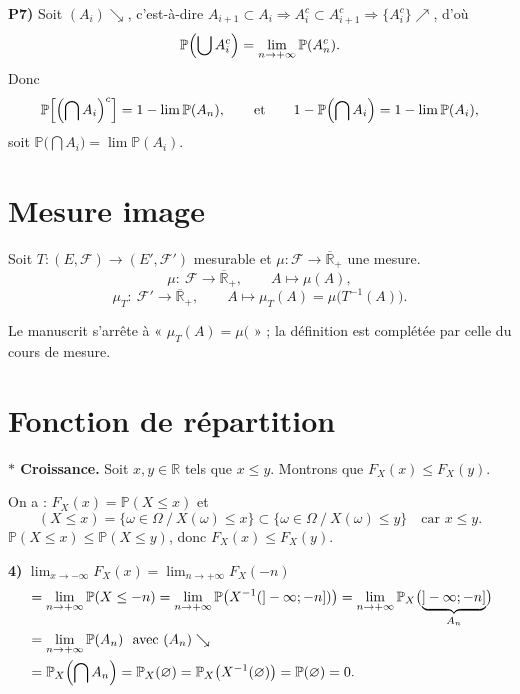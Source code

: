 \documentclass[11pt,a4paper]{article}
\newcommand{\R}{\mathbb{R}}
\newcommand{\Rb}{\overline{\mathbb{R}}}
\newcommand{\Ff}{\mathscr{F}}
\newcommand{\PP}{\mathbb{P}}
\begin{document}
\textbf{\color{bleu}P7)} Soit $(A_i)\searrow$, c'est-à-dire $A_{i+1}\subset A_i\Rightarrow A_i^c\subset A_{i+1}^c\Rightarrow\{A_i^c\}\nearrow$, d'où
\[
  \PP\Bigl(\bigcup A_i^c\Bigr)=\lim_{n\to+\infty}\PP(A_n^c).
\]
Donc
\[
  \PP\Bigl[\Bigl(\bigcap A_i\Bigr)^c\Bigr]=1-\lim\PP(A_n),\qquad\text{et}\qquad 1-\PP\Bigl(\bigcap A_i\Bigr)=1-\lim\PP(A_i),
\]
soit $\PP\bigl(\bigcap A_i\bigr)=\lim\PP(A_i)$.

\section*{Mesure image}

Soit $T:(E,\Ff)\to(E',\Ff')$ mesurable et $\mu:\Ff\to\Rb_+$ une mesure.
\[
  \mu:\ \Ff\longrightarrow\Rb_+,\qquad A\longmapsto\mu(A),
\]
\[
  \mu_T:\ \Ff'\longrightarrow\Rb_+,\qquad A\longmapsto\mu_T(A)=\mu\bigl(T^{-1}(A)\bigr).
\]

\begin{note}
Le manuscrit s'arrête à « $\mu_T(A)=\mu($ » ; la définition est complétée par celle du cours de mesure.
\end{note}

\section*{Fonction de répartition}

\textbf{\color{bleu}$\ast$ Croissance.} Soit $x,y\in\R$ tels que $x\le y$. Montrons que $F_X(x)\le F_X(y)$.

On a : $F_X(x)=\PP(X\le x)$ et
\[
  (X\le x)=\{\omega\in\Omega\ /\ X(\omega)\le x\}\subset\{\omega\in\Omega\ /\ X(\omega)\le y\}\quad\text{car }x\le y .
\]
$\PP(X\le x)\le\PP(X\le y)$, donc $F_X(x)\le F_X(y)$.

\medskip
\textbf{\color{bleu}4)} \quad $\displaystyle\lim_{x\to-\infty}F_X(x)=\lim_{n\to+\infty}F_X(-n)$
\begin{align*}
  &=\lim_{n\to+\infty}\PP(X\le-n)=\lim_{n\to+\infty}\PP\bigl(X^{-1}(]-\infty;-n])\bigr)=\lim_{n\to+\infty}\PP_X\bigl(\underbrace{]-\infty;-n]}_{A_n}\bigr)\\
  &=\lim_{n\to+\infty}\PP(A_n)\ \text{ avec }(A_n)\searrow\\
  &=\PP_X\Bigl(\bigcap A_n\Bigr)=\PP_X(\varnothing)=\PP_X\bigl(X^{-1}(\varnothing)\bigr)=\PP(\varnothing)=0 .
\end{align*}
\end{document}
